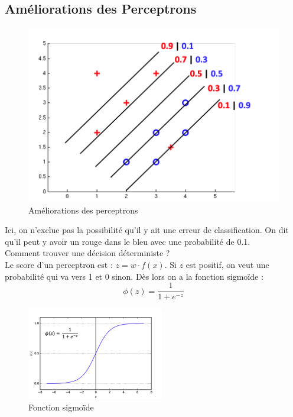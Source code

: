 \subsection{Améliorations des Perceptrons}
\label{sub:améliorations_des_perceptrons}
\begin{figure}[H]
    \centering
    \includegraphics[scale=0.6]{pictures/better_perceptrons.png}
    \caption{Améliorations des perceptrons}
\end{figure}
Ici, on n'exclue pas la possibilité qu'il y ait une erreur de classification. On dit qu'il peut y avoir un rouge dans le 
bleu avec une probabilité de 0.1.\\
Comment trouver une décision déterministe ?\\
Le score d'un perceptron est : $z = w\cdot f(x)$. Si $z$ est positif, on veut une probabilité qui va vers 1 et 0 sinon.
Dès lors on a la fonction sigmoïde :
\begin{equation*}
    \phi(z) = \frac{1}{1+e^{-z}}
\end{equation*}
\begin{figure}[H]
    \centering
    \includegraphics[scale=0.6]{pictures/sigmoid.png}
    \caption{Fonction sigmoïde}
\end{figure}


